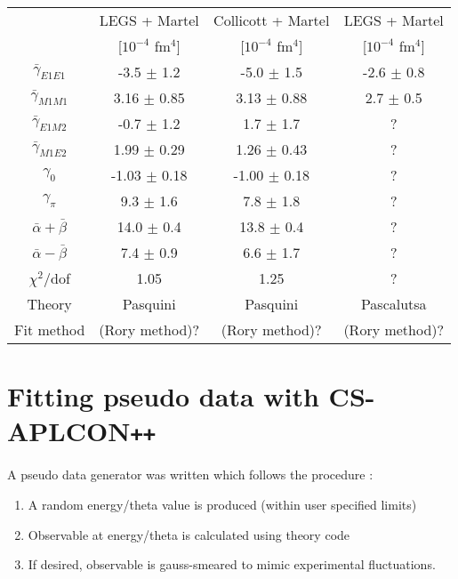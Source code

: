 \documentclass[]{article}
\begin{document}
\begin{table}[h!]
	\centering %
	\begin{tabular}{|c|c|c|c|} %
		\hline %
		& LEGS + Martel & Collicott + Martel & LEGS + Martel\\
		& [$10^{-4}$ fm$^{4}$] & [$10^{-4}$ fm$^{4}$] & [$10^{-4}$ fm$^{4}$]\\
		\hline\hline
		$\bar{\gamma}_{E1E1}$ & -3.5 $\pm$ 1.2 				& -5.0 $\pm$ 1.5 \hspace{1mm} & -2.6 $\pm$ 0.8 \\
		$\bar{\gamma}_{M1M1}$ & \hspace{1mm}3.16 $\pm$ 0.85 	& 3.13 $\pm$ 0.88 & 2.7 $\pm$ 0.5 \\
		$\bar{\gamma}_{E1M2}$ & -0.7 $\pm$ 1.2 				& 1.7 $\pm$ 1.7 & ?\\
		$\bar{\gamma}_{M1E2}$ & \hspace{1mm}1.99 $\pm$ 0.29 	& 1.26 $\pm$ 0.43 & ?\\
		\hline
		$\gamma_{0}$ 	& -1.03 $\pm$ 0.18 				& -1.00 $\pm$ 0.18\hspace{1.5mm} & ?\\
		$\gamma_{\pi}$ 	& \hspace{1mm}9.3 $\pm$ 1.6 	& 7.8 $\pm$ 1.8 & ?\\%
		$\bar{\alpha} + \bar{\beta}$ & 14.0 $\pm$ 0.4 	& 13.8 $\pm$ 0.4\hspace{1mm} & ?\\
		$\bar{\alpha} - \bar{\beta}$ & \hspace{1mm}7.4 $\pm$ 0.9 	& 6.6 $\pm$ 1.7 & ?\\[0.5ex]
		\hline %
		$\chi^{2}$/dof & 1.05 & 1.25 & ?\\[0.5ex]
		\hline
		Theory & Pasquini & Pasquini & Pascalutsa\\[0.5ex]
		Fit method & (Rory method)? & (Rory method)? & (Rory method)? \\[0.5ex]
		\hline
	\end{tabular}
\end{table}
%
\newpage
\section{Fitting pseudo data with CS-APLCON\texttt{++}}

A pseudo data generator was written which follows the procedure :

\begin{enumerate}
	\item A random energy/theta value is produced (within user specified limits)
	\item Observable at energy/theta is calculated using theory code
	\item If desired, observable is gauss-smeared to mimic experimental fluctuations.
\end{enumerate}
\end{document}
